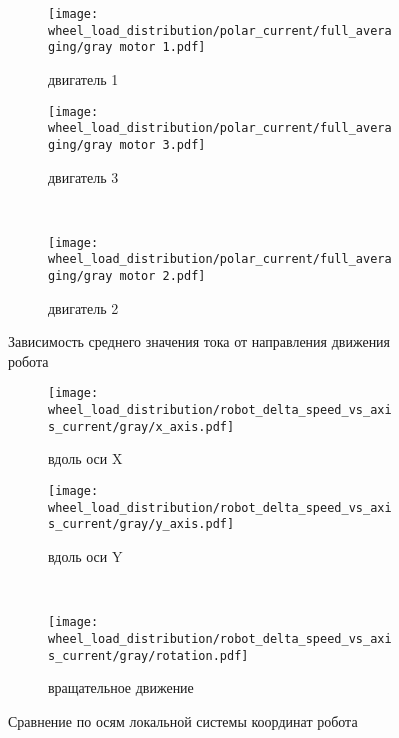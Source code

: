 \begin{figure}[H]
    \centering
    \begin{subfigure}{0.49\textwidth}
        \centering
        \texttt{[image: wheel\_load\_distribution/polar\_current/full\_averaging/gray motor 1.pdf]}
        \caption{двигатель 1}
    \end{subfigure}
    \hspace{0.005\textwidth}
    \begin{subfigure}{0.49\textwidth}
        \centering
        \texttt{[image: wheel\_load\_distribution/polar\_current/full\_averaging/gray motor 3.pdf]}
        \caption{двигатель 3}
    \end{subfigure} \\
    \vspace{4pt}
    \centering
    \begin{subfigure}{0.49\textwidth}
        \centering
        \texttt{[image: wheel\_load\_distribution/polar\_current/full\_averaging/gray motor 2.pdf]}
        \caption{двигатель 2}
    \end{subfigure}
    \caption{Зависимость среднего значения тока от направления движения робота}
\end{figure}

\begin{figure}[H]
    \centering
    \begin{subfigure}{0.49\textwidth}
        \centering
        \texttt{[image: wheel\_load\_distribution/robot\_delta\_speed\_vs\_axis\_current/gray/x\_axis.pdf]}
        \caption{вдоль оси X}
    \end{subfigure}
    \hspace{0.005\textwidth}
    \begin{subfigure}{0.49\textwidth}
        \centering
        \texttt{[image: wheel\_load\_distribution/robot\_delta\_speed\_vs\_axis\_current/gray/y\_axis.pdf]}
        \caption{вдоль оси Y}
    \end{subfigure} \\
    \vspace{4pt}
    \centering
    \begin{subfigure}{0.49\textwidth}
        \centering
        \texttt{[image: wheel\_load\_distribution/robot\_delta\_speed\_vs\_axis\_current/gray/rotation.pdf]}
        \caption{вращательное движение}
    \end{subfigure}
    \caption{Сравнение по осям локальной системы координат робота}
\end{figure}


